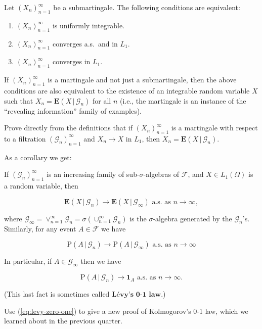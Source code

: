 \begin{thm}
Let $(X_n)_{n=1}^\infty$ be a submartingale. The
following conditions are equivalent:

\begin{enumerate}[label=\arabic*.]
\item $(X_n)_{n=1}^\infty$ is uniformly integrable.

\item $(X_n)_{n=1}^\infty$ converges a.s.\ and in $L_1$.

\item $(X_n)_{n=1}^\infty$ converges in $L_1$.
\end{enumerate}

\noindent If $(X_n)_{n=1}^\infty$ is a martingale and not just
a submartingale, then the above conditions are also
equivalent to the existence of an integrable random
variable $X$ such that
$X_n = \mathbf{E}\left(X\,|\,\mathcal{G}_n\right)$
for all $n$ (i.e., the martingale is an instance of
the ``revealing information'' family of examples).
\end{thm}

\begin{xexercise}
Prove directly from the definitions that if
$(X_n)_{n=1}^\infty$ is a martingale with respect to
a filtration $(\mathcal{G}_n)_{n=1}^\infty$ and
$X_n\to X$ in $L_1$, then
$X_n = \mathbf{E}\left(X\,|\,\mathcal{G}_n\right)$.
\end{xexercise}

\noindent As a corollary we get:

\begin{thm}
\label{eq:levy-martingale-conv}
If $(\mathcal{G}_n)_{n=1}^\infty$ is an increasing
family of sub-$\sigma$-algebras of $\mathcal{F}$, and
$X\in L_1(\Omega)$ is a random variable, then

\[
\mathbf{E}\left(X\,|\,\mathcal{G}_n\right) \to \mathbf{E}\left(X\,|\,\mathcal{G}_\infty\right) \textrm{ a.s. as }n\to\infty,
\]

\noindent where
$\mathcal{G}_\infty = \vee_{n=1}^\infty \mathcal{G}_n
= \sigma\left(\cup_{n=1}^\infty \mathcal{G}_n\right)$
is the $\sigma$-algebra generated by the
$\mathcal{G}_n$'s. Similarly, for any event
$A\in \mathcal{F}$ we have

\[
\mathrm{P}\left(A\,|\,\mathcal{G}_n\right) \to \mathrm{P}\left(A\,|\,\mathcal{G}_\infty\right) \textrm{ a.s. as }n\to\infty
\]

\noindent In particular, if $A \in \mathcal{G}_\infty$ then we
have

\begin{equation*} \tag{8}\label{eq:levy-zero-one}
\mathrm{P}\left(A\,|\,\mathcal{G}_n\right) \to \mathbf{1}_A \textrm{ a.s. as }n\to\infty.
\end{equation*}

\noindent (This last fact is sometimes called
$\textbf{Lévy's 0-1 law}$.)
\end{thm}

\begin{xexercise}
Use (\ref{eq:levy-zero-one}) to give a new proof of
Kolmogorov's 0-1 law, which we learned about in the
previous quarter.
\end{xexercise}

